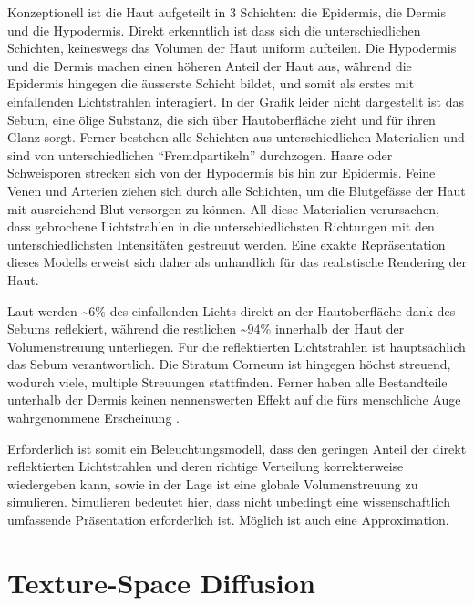 \documentclass[ngerman,runningheads,a4paper]{llncs}[2018/03/10]
\begin{document}
Konzeptionell ist die Haut aufgeteilt in 3 Schichten: die Epidermis, die Dermis und die Hypodermis.
Direkt erkenntlich ist dass sich die unterschiedlichen Schichten, keineswegs das Volumen der Haut uniform aufteilen.
Die Hypodermis und die Dermis machen einen höheren Anteil der Haut aus, während die Epidermis hingegen die äusserste Schicht bildet, und somit als erstes mit einfallenden Lichtstrahlen interagiert.
In der Grafik leider nicht dargestellt ist das Sebum, eine ölige Substanz, die sich über Hautoberfläche zieht und für ihren Glanz sorgt.
Ferner bestehen alle Schichten aus unterschiedlichen Materialien und sind von unterschiedlichen \enquote{Fremdpartikeln} durchzogen.
Haare oder Schweisporen strecken sich von der Hypodermis bis hin zur Epidermis.
Feine Venen und Arterien ziehen sich durch alle Schichten, um die Blutgefässe der Haut mit ausreichend Blut versorgen zu können.
All diese Materialien verursachen, dass gebrochene Lichtstrahlen in die unterschiedlichsten Richtungen mit den unterschiedlichsten Intensitäten gestreuut werden.
Eine exakte Repräsentation dieses Modells erweist sich daher als unhandlich für das realistische Rendering der Haut.

Laut \citet{tuchin2015tissue} werden \textasciitilde{}6\% des einfallenden Lichts direkt an der Hautoberfläche dank des Sebums reflekiert, während die restlichen \textasciitilde{}94\% innerhalb der Haut der Volumenstreuung unterliegen.
Für die reflektierten Lichtstrahlen ist hauptsächlich das Sebum verantwortlich.
Die Stratum Corneum ist hingegen höchst streuend, wodurch viele, multiple Streuungen stattfinden.
Ferner haben alle Bestandteile unterhalb der Dermis keinen nennenswerten Effekt auf die fürs menschliche Auge wahrgenommene Erscheinung \cite{tuchin2015tissue}.

Erforderlich ist somit ein Beleuchtungsmodell, dass den geringen Anteil der direkt reflektierten Lichtstrahlen und deren richtige Verteilung korrekterweise wiedergeben kann, sowie in der Lage ist eine globale Volumenstreuung zu simulieren.
Simulieren bedeutet hier, dass nicht unbedingt eine wissenschaftlich umfassende Präsentation erforderlich ist.
Möglich ist auch eine Approximation.

\section{Texture-Space Diffusion}
\label{sec:texture-space}
\end{document}
